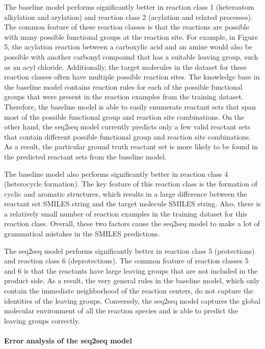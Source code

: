 The baseline model performs significantly better in reaction class 1 (heteroatom alkylation and arylation) and reaction class 2 (acylation and related processes). The common feature of these reaction classes is that the reactions are possible with many possible functional groups at the reaction site. For example, in Figure 5, the acylation reaction between a carboxylic acid and an amine would also be possible with another carbonyl compound that has a suitable leaving group, such as an acyl chloride. Additionally, the target molecules in the dataset for these reaction classes often have multiple possible reaction sites. The knowledge base in the baseline model contains reaction rules for each of the possible functional groups that were present in the reaction examples from the training dataset. Therefore, the baseline model is able to easily enumerate reactant sets that span most of the possible functional group and reaction site combinations. On the other hand, the seq2seq model currently predicts only a few valid reactant sets that contain different possible functional group and reaction site combinations. As a result, the particular ground truth reactant set is more likely to be found in the predicted reactant sets from the baseline model. 

The baseline model also performs significantly better in reaction class 4 (heterocycle formation). The key feature of this reaction class is the formation of cyclic and aromatic structures, which results in a large difference between the reactant set SMILES string and the target molecule SMILES string. Also, there is a relatively small number of reaction examples in the training dataset for this reaction class. Overall, these two factors cause the seq2seq model to make a lot of grammatical mistakes in the SMILES predictions. 

The seq2seq model performs significantly better in reaction class 5 (protections) and reaction class 6 (deprotections). The common feature of reaction classes 5 and 6 is that the reactants have large leaving groups that are not included in the product side. As a result, the very general rules in the baseline model, which only contain the immediate neighborhood of the reaction centers, do not capture the identities of the leaving groups. Conversely, the seq2seq model captures the global molecular environment of all the reaction species and is able to predict the leaving groups correctly. 

\paragraph{Error analysis of the seq2seq model}

